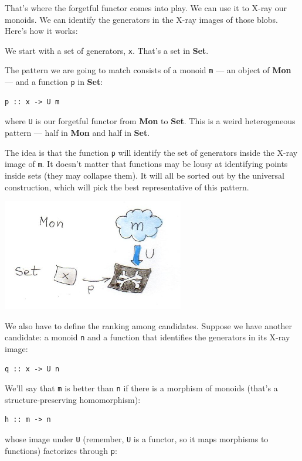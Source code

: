 That's where the forgetful functor comes into play. We can use it to
X-ray our monoids. We can identify the generators in the X-ray images of
those blobs. Here's how it works:

We start with a set of generators, \texttt{x}. That's a set in
\textbf{Set}.

The pattern we are going to match consists of a monoid \texttt{m} --- an
object of \textbf{Mon} --- and a function \texttt{p} in \textbf{Set}:

\begin{verbatim}
p :: x -> U m
\end{verbatim}

where \texttt{U} is our forgetful functor from \textbf{Mon} to
\textbf{Set}. This is a weird heterogeneous pattern --- half in
\textbf{Mon} and half in \textbf{Set}.

The idea is that the function \texttt{p} will identify the set of
generators inside the X-ray image of \texttt{m}. It doesn't matter that
functions may be lousy at identifying points inside sets (they may
collapse them). It will all be sorted out by the universal construction,
which will pick the best representative of this pattern.

\includegraphics[width=3.12500in]{images/monoid-pattern.jpg}

We also have to define the ranking among candidates. Suppose we have
another candidate: a monoid \texttt{n} and a function that identifies
the generators in its X-ray image:

\begin{verbatim}
q :: x -> U n
\end{verbatim}

We'll say that \texttt{m} is better than \texttt{n} if there is a
morphism of monoids (that's a structure-preserving homomorphism):

\begin{verbatim}
h :: m -> n
\end{verbatim}

whose image under \texttt{U} (remember, \texttt{U} is a functor, so it
maps morphisms to functions) factorizes through \texttt{p}:

